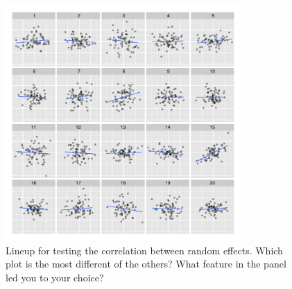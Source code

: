 \documentclass[12pt]{article}
\newcommand{\alnote}[1]{\todo[inline,color=green!40]{#1}} %
\begin{document}
\begin{figure}[hbt]
	\centering
	\includegraphics[width=0.8\textwidth]{examcorr-15.pdf}
	\caption{\label{fig:ranef-corr} Lineup for testing the correlation between random effects. Which plot is the most different of the others? What feature in the panel led you to your choice?}
\end{figure}

%


\end{document}
